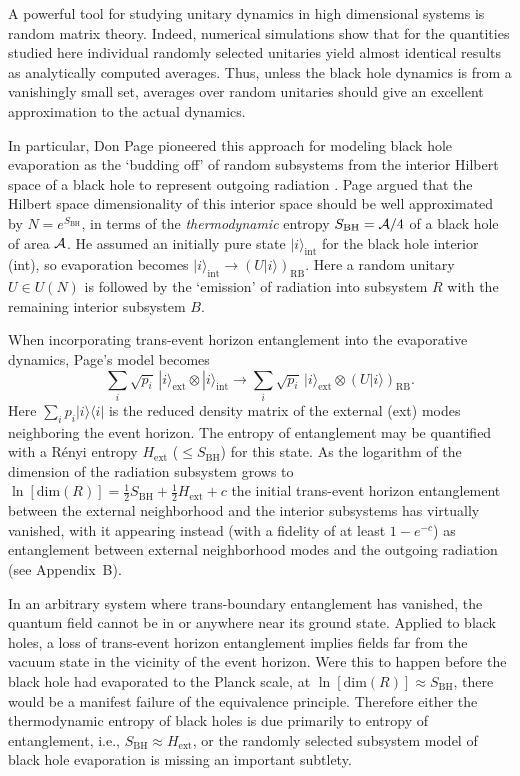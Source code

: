 \documentclass[12pt,aps,prl]{revtex4}
\begin{document}
A powerful tool for studying unitary dynamics in high dimensional systems
is random matrix theory. Indeed, numerical simulations show that for the
quantities studied here individual randomly selected unitaries yield
almost identical results as analytically computed averages. Thus,
unless the black hole dynamics is from a vanishingly small
set, averages over random unitaries should give an excellent
approximation to the actual dynamics.

In particular, Don Page \cite{Page93} pioneered this approach for modeling
black hole evaporation as the `budding off' of random subsystems from
the interior Hilbert space of a black hole to represent outgoing
radiation \cite{Page93,Hayden07,B09}. Page argued that the Hilbert
space dimensionality of this interior space should be well approximated
by $N=e^{S_{\text{BH}}}$, in terms of the {\it thermodynamic\/} entropy
$S_{\text{BH}}={\cal A}/4$ of a black hole of area ${\cal A}$. He
assumed an initially pure state $|i\rangle_{\text{int}}$ for the black
hole interior (int), so evaporation becomes 
$|i\rangle_{\text{int}}\rightarrow (U|i\rangle)_{\text{RB}}$. Here a
random unitary $U\in U(N)$ is followed by the `emission' of radiation
into subsystem $R$ with the remaining interior subsystem $B$.

When incorporating trans-event horizon entanglement into the
evaporative dynamics, Page's model becomes
$$
\sum_{i}\sqrt{p_i}\, |i\rangle_{\text{ext}}\otimes|i\rangle_{\text{int}}
\rightarrow
\sum_{i} \sqrt{p_i}\,
|i\rangle_{\text{ext}}\otimes(U|i\rangle)_{\text{RB}}.
$$
Here $\sum_i p_i |i\rangle%
\langle i|$
is the reduced density matrix of the external (ext) modes neighboring
the event horizon.  The entropy of entanglement may be quantified with
a R\'enyi entropy $H_{\text{ext}}$ ($\le S_{\text{BH}}$) for this state.
As the logarithm of the dimension of the radiation subsystem grows to
$\ln[{\text{dim}}(R)]=\frac{1}{2}S_{\text{BH}}+\frac{1}{2}H_{\text{ext}}+c$
the initial trans-event horizon entanglement between the external
neighborhood and the interior subsystems has virtually vanished, with
it appearing instead (with a fidelity of at least $1-e^{-c}$) as
entanglement between external neighborhood modes and the outgoing
radiation (see Appendix~B).

In an arbitrary system where trans-boundary entanglement has vanished,
the quantum field cannot be in or anywhere near its ground state.
Applied to black holes, a loss of trans-event horizon entanglement
implies fields far from the vacuum state in the vicinity of the event
horizon. Were this to happen before the black hole had evaporated to
the Planck scale, at $\ln[{\text{dim}}(R)]\approx S_{\text{BH}}$, there
would be a manifest failure of the equivalence principle. Therefore
either the thermodynamic entropy of black holes is due primarily to
entropy of entanglement, i.e., $S_{\text{BH}}\approx H_{\text{ext}}$,
or the randomly selected subsystem model of black hole evaporation is
missing an important subtlety.
\end{document}
